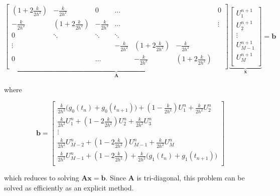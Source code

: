 \begin{tcolorbox}[colback=gray!5!white,colframe=gray!75!black]
\begin{equation}\label{eq:cranknic_mol}
    \underbrace{
    \begin{bmatrix}
        (1 + 2\frac{k}{2h^2}) & - \frac{k}{2h^2}      &          0       & \dots            &  &  & 0\\
        - \frac{k}{2h^2}      & (1 + 2\frac{k}{2h^2}) & - \frac{k}{2h^2} & \dots            &   &  & \vdots\\
        0                     & \ddots                & \ddots           & \ddots           &  &  &  \\
        \vdots                &                       &                  & - \frac{k}{2h^2} & (1 + 2\frac{k}{2h^2}) & - \frac{k}{2h^2}     \\
        0                     &                       &       \dots       &                  & - \frac{k}{2h^2}      & (1 + 2\frac{k}{2h^2})\\
    \end{bmatrix}
    }_{\boldsymbol{A}}
    \underbrace{
    \begin{bmatrix}
        U_{1}^{n+1} \\
        U_{2}^{n+1} \\
        \vdots \\
        U_{M-1}^{n+1} \\
        U_{M}^{n+1} \\
    \end{bmatrix}
    }_{\boldsymbol{x}}
    = 
    \boldsymbol{b}
\end{equation}

where 

\begin{equation*}
    \boldsymbol{b} = 
    \begin{bmatrix}
        \frac{k}{2h^2}\big(g_0(t_{n}) + g_0(t_{n+1})\big) + (1 - \frac{k}{2h^2})U_1^n + \frac{k}{2h^2}U_2^n \\
        \frac{k}{2h^2}U_1^n + (1-2\frac{k}{2h^2})U_2^n + \frac{k}{2h^2}U_3^n \\
        \vdots \\
        \frac{k}{2h^2} U_{M-2}^n + (1-2\frac{k}{2h^2})U_{M-1}^n + \frac{k}{2h^2}U_M^n \\
        \frac{k}{2h^2}U_{M-1}^n + (1-2\frac{k}{2h^2}) + \frac{k}{2h^2}\big(g_1(t_{n}) + g_1(t_{n+1})\big) \\
    \end{bmatrix}
\end{equation*}

which reduces to solving $\boldsymbol{Ax} = \boldsymbol{b}$. Since $\boldsymbol{A}$ is tri-diagonal, this problem can be solved as efficiently as an explicit method. 
\end{tcolorbox}

